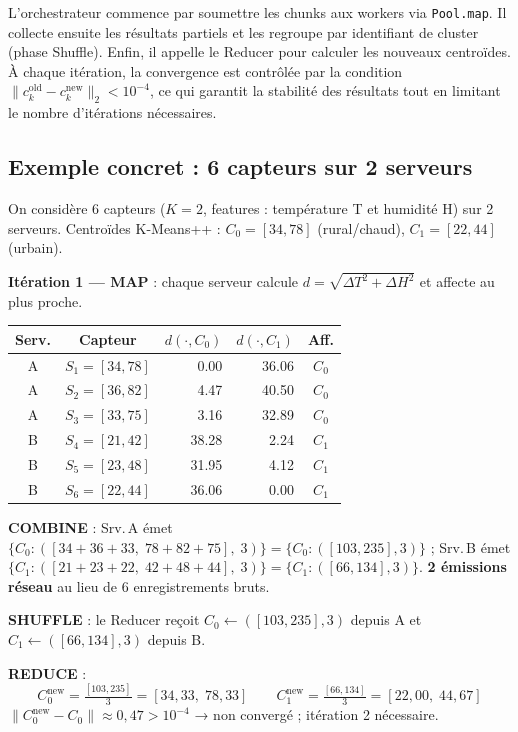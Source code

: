 \documentclass[12pt,a4paper]{article}
\begin{document}
L'orchestrateur commence par soumettre les chunks aux workers via \texttt{Pool.map}.
Il collecte ensuite les résultats partiels et les regroupe par identifiant de cluster
(phase Shuffle). Enfin, il appelle le Reducer pour calculer les nouveaux centroïdes.
À chaque itération, la convergence est contrôlée par la condition
$\|c_k^{\text{old}} - c_k^{\text{new}}\|_2 < 10^{-4}$, ce qui garantit la stabilité
des résultats tout en limitant le nombre d'itérations nécessaires.


\subsection{Exemple concret : 6 capteurs sur 2 serveurs}

On considère 6 capteurs ($K{=}2$, features : température T et humidité H) sur 2 serveurs.
Centroïdes K-Means++ : $C_0{=}[34,78]$ (rural/chaud), $C_1{=}[22,44]$ (urbain).

\smallskip
\noindent\textbf{Itération 1 — MAP} : chaque serveur calcule $d{=}\sqrt{\Delta T^2+\Delta H^2}$ et affecte au plus proche.

\begin{center}
\small
\begin{tabular}{@{}ccrrc@{}}
\toprule
\textbf{Serv.} & \textbf{Capteur} & $d(\cdot,C_0)$ & $d(\cdot,C_1)$ & \textbf{Aff.} \\
\midrule
A & $S_1=[34,78]$ & 0.00 & 36.06 & $C_0$ \\
A & $S_2=[36,82]$ & 4.47 & 40.50 & $C_0$ \\
A & $S_3=[33,75]$ & 3.16 & 32.89 & $C_0$ \\
\midrule
B & $S_4=[21,42]$ & 38.28 & 2.24 & $C_1$ \\
B & $S_5=[23,48]$ & 31.95 & 4.12 & $C_1$ \\
B & $S_6=[22,44]$ & 36.06 & 0.00 & $C_1$ \\
\bottomrule
\end{tabular}
\end{center}

\noindent\textbf{COMBINE} : Srv.\,A émet $\{C_0:([34{+}36{+}33,\;78{+}82{+}75],\;3)\}{=}\{C_0:([103,235],3)\}$ ;
Srv.\,B émet $\{C_1:([21{+}23{+}22,\;42{+}48{+}44],\;3)\}{=}\{C_1:([66,134],3)\}$.
\textbf{2 émissions réseau} au lieu de 6 enregistrements bruts.

\noindent\textbf{SHUFFLE} : le Reducer reçoit $C_0{\leftarrow}([103,235],3)$ depuis A et
$C_1{\leftarrow}([66,134],3)$ depuis B.

\noindent\textbf{REDUCE} :
\[
  C_0^{\text{new}} = \tfrac{[103,235]}{3} = [34{,}33,\;78{,}33]
  \qquad
  C_1^{\text{new}} = \tfrac{[66,134]}{3} = [22{,}00,\;44{,}67]
\]
$\|C_0^{\text{new}}{-}C_0\| \approx 0{,}47 > 10^{-4}$ → non convergé ; itération 2 nécessaire.
\end{document}
